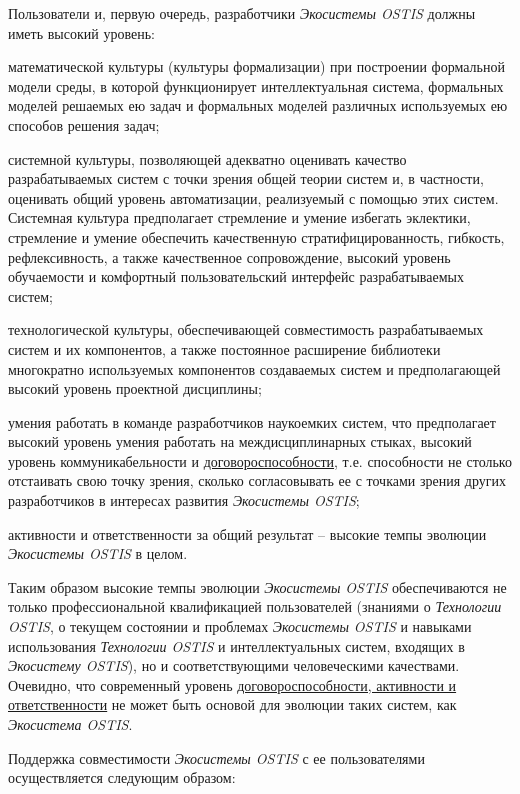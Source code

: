 \begin{SCn}
{Пользователи и, первую очередь, разработчики  \textit{Экосистемы OSTIS}  должны иметь высокий уровень:
\begin{scnitemize}
\item математической культуры (культуры формализации) при построении формальной модели среды, в которой функционирует интеллектуальная система, формальных моделей решаемых ею задач и формальных моделей различных используемых ею способов решения задач;
\item системной культуры, позволяющей адекватно оценивать качество разрабатываемых систем с точки зрения общей теории систем и, в частности, оценивать общий уровень автоматизации, реализуемый с помощью этих систем. Системная культура предполагает стремление и умение избегать эклектики, стремление и умение обеспечить качественную стратифицированность, гибкость, рефлексивность, а также качественное сопровождение, высокий уровень обучаемости и комфортный пользовательский интерфейс разрабатываемых систем;
\item технологической культуры, обеспечивающей совместимость разрабатываемых систем и их компонентов, а также постоянное расширение библиотеки многократно используемых компонентов создаваемых систем и предполагающей высокий уровень проектной дисциплины;
\item умения работать в команде разработчиков наукоемких систем, что предполагает высокий уровень умения работать на междисциплинарных стыках, высокий уровень коммуникабельности и \uline{договороспособности}, т.е. способности не столько отстаивать свою точку зрения, сколько согласовывать ее  с точками зрения других разработчиков в интересах развития \textit{Экосистемы OSTIS};
\item активности и ответственности за общий результат -- высокие темпы эволюции \textit{Экосистемы OSTIS} в целом.
\end{scnitemize}

Таким образом высокие темпы эволюции \textit{Экосистемы OSTIS} обеспечиваются не только профессиональной квалификацией пользователей (знаниями о \textit{Технологии OSTIS}, о текущем состоянии и проблемах \textit{Экосистемы OSTIS} и навыками использования \textit{Технологии OSTIS} и интеллектуальных систем, входящих в \textit{Экосистему OSTIS}), но и соответствующими человеческими качествами. Очевидно, что современный уровень \uline{договороспособности, активности и ответственности} не может быть основой для эволюции таких систем, как \textit{Экосистема OSTIS}.

Поддержка совместимости \textit{Экосистемы OSTIS} с ее пользователями осуществляется следующим образом:


}
\end{SCn}
